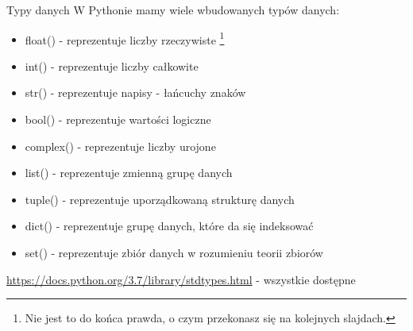 \begin{frame}{Typy danych}
    W Pythonie mamy wiele wbudowanych typów danych:
    \begin{itemize}
        \item float() - reprezentuje liczby rzeczywiste \footnote{Nie jest to do końca prawda, o czym przekonasz się na kolejnych slajdach.} \\
        \item int() - reprezentuje liczby całkowite \\
        \item str() - reprezentuje napisy - łańcuchy znaków \\
        \item bool() - reprezentuje wartości logiczne \\
        \item complex() - reprezentuje liczby urojone \\
        \item list() - reprezentuje zmienną grupę danych \\
        \item tuple() - reprezentuje uporządkowaną strukturę danych \\
        \item dict() - reprezentuje grupę danych, które da się indeksować \\
        \item set() - reprezentuje zbiór danych w rozumieniu teorii zbiorów \\
    \end{itemize}
    \url{https://docs.python.org/3.7/library/stdtypes.html} - wszystkie dostępne
\end{frame}

